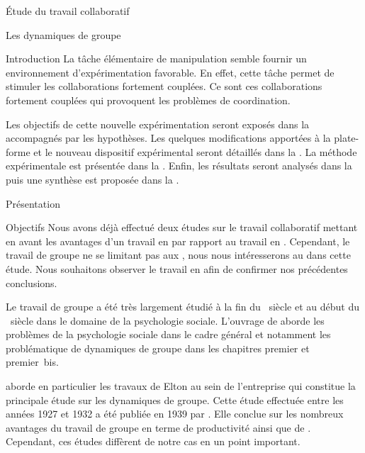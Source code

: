 \documentclass[myfrancais]{mythesis}
\begin{document}
\begin{mypart}{Étude du travail collaboratif}
\begin{mychapter}{Les dynamiques de groupe}
\begin{mysection}{Introduction}
				La tâche élémentaire de manipulation semble fournir un environnement d'expérimentation favorable.
				En effet, cette tâche permet de stimuler les collaborations fortement couplées.
				Ce sont ces collaborations fortement couplées qui provoquent les problèmes de coordination.

				Les objectifs de cette nouvelle expérimentation seront exposés dans la  accompagnés par les hypothèses.
				Les quelques modifications apportées à la plate-forme et le nouveau dispositif expérimental seront détaillés dans la .
				La méthode expérimentale est présentée dans la .
				Enfin, les résultats seront analysés dans la  puis une synthèse est proposée dans la .
			\end{mysection}
			\begin{mysection}{Présentation}
				\begin{mysubsection}{Objectifs}
					Nous avons déjà effectué deux études sur le travail collaboratif mettant en avant les avantages d'un travail en  par rapport au travail en .
					Cependant, le travail de groupe ne se limitant pas aux , nous nous intéresserons au  dans cette étude.
					Nous souhaitons observer le travail en  afin de confirmer nos précédentes conclusions.

					Le travail de groupe a été très largement étudié à la fin du ~siècle et au début du ~siècle dans le domaine de la psychologie sociale.
					L'ouvrage de  aborde les problèmes de la psychologie sociale dans le cadre général et notamment les problématique de dynamiques de groupe dans les chapitres premier et premier~bis.

					 aborde en particulier les travaux de Elton  au sein de l'entreprise \myHawthorne qui constitue la principale étude sur les dynamiques de groupe.
					Cette étude effectuée entre les années 1927 et 1932 a été publiée en 1939 par .
					Elle conclue sur les nombreux avantages du travail de groupe en terme de productivité ainsi que de .
					Cependant, ces études diffèrent de notre cas en un point important.


\end{mysubsection}
\end{mysection}
\end{mychapter}
\end{mypart}
\end{document}
